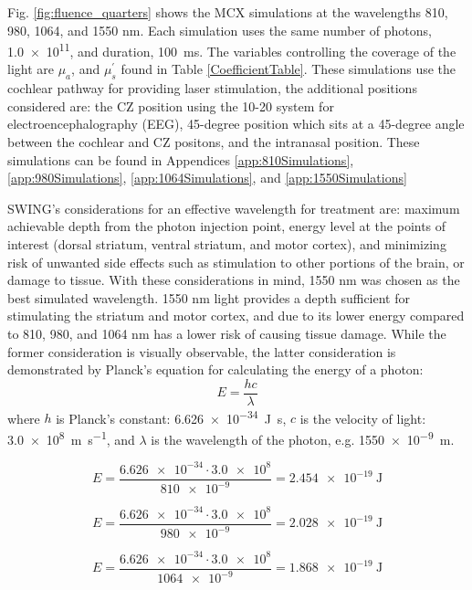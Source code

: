 \documentclass[journal,twoside,web]{ieeecolor}
\begin{document}
Fig. \ref{fig:fluence_quarters} shows the MCX simulations at the wavelengths 810, 980, 1064, and 1550 nm. Each simulation uses the same number
of photons, \num{1.0e11}, and duration, \SI{100}{\milli\second}. The variables controlling the coverage of the light are 
$\mu_{a}$, and $\mu_{s}^{'}$ found in Table \ref{CoefficientTable}. These simulations use the cochlear pathway for providing laser stimulation, the additional 
positions considered are: the CZ position using the 10-20 system for electroencephalography (EEG), 45-degree position which sits at a 45-degree angle between the 
cochlear and CZ positons, and the intranasal position. These simulations can be found in Appendices \ref{app:810Simulations}, \ref{app:980Simulations}, 
\ref{app:1064Simulations}, and \ref{app:1550Simulations}

SWING's considerations for an effective wavelength for treatment are: maximum achievable depth from the photon injection point, energy level at the points of interest 
(dorsal striatum, ventral striatum, and motor cortex), and minimizing risk of unwanted side effects such as stimulation to other portions 
of the brain, or damage to tissue. With these considerations in mind, 1550 nm was chosen as the best simulated wavelength. 1550 nm light 
provides a depth sufficient for stimulating the striatum and motor cortex, and due to its lower energy compared to 810, 980, and 1064 nm has a 
lower risk of causing tissue damage. While the former consideration is visually observable, the latter consideration is demonstrated by 
Planck's equation for calculating the energy of a photon:
\begin{equation}
    \label{eq:PhotonEnergy}
    E = \frac{hc}{\lambda}
\end{equation}
where $h$ is Planck's constant: \SI{6.626e-34}{\joule\second}, $c$ is the velocity of light: \SI{3.0e8}{\meter\per\second}, and $\lambda$ is 
the wavelength of the photon, e.g. \SI{1550e-9}{\meter}. 

\begin{equation}
    \label{eq:810Energy}
    E = \frac{\num{6.626e-34}\cdot\num{3.0e8}}{\num{810e-9}} = \SI{2.454e-19}{\joule}
\end{equation}

\begin{equation}
    \label{eq:980Energy}
    E = \frac{\num{6.626e-34}\cdot\num{3.0e8}}{\num{980e-9}} = \SI{2.028e-19}{\joule}
\end{equation}

\begin{equation}
    \label{eq:1064Energy}
    E = \frac{\num{6.626e-34}\cdot\num{3.0e8}}{\num{1064e-9}} = \SI{1.868e-19}{\joule}
\end{equation}
\end{document}
